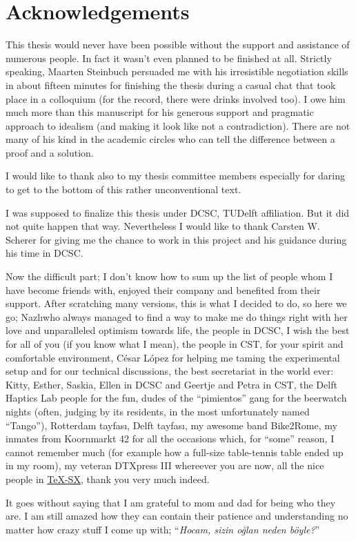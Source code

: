 \chapter{Acknowledgements}

This thesis would never have been possible without the support and assistance of numerous people. In fact it wasn't even planned to be 
finished at all. Strictly speaking, Maarten Steinbuch persuaded me with his irresistible negotiation skills in about fifteen minutes for 
finishing the thesis during a casual chat that took place in a colloquium (for the record, there were drinks involved too). 
I owe him much more than this manuscript for his generous support and pragmatic approach to idealism (and making it look like not a 
contradiction). There are not many of his kind in the academic circles who can tell the difference between a proof and a solution.

I would like to thank also to my thesis committee members especially for daring to get to the bottom of this rather unconventional text. 

I was supposed to finalize this thesis under DCSC, \textsf{TUDelft} affiliation. But it did not quite happen that way. Nevertheless I would like to 
thank Carsten W. Scherer for giving me the chance to work in this project and his guidance during his time in DCSC. 

Now the difficult part; I don't know how to sum up the list of people whom I have become friends with, enjoyed their company and benefited 
from their support. After scratching many versions, this is what I decided to do, so here we go; Nazl\i\space who always managed to find a 
way to make me do things right with her love and unparalleled optimism towards life, the people in DCSC, I wish the best for 
all of you (if you know what I mean), the people in CST, for your spirit and comfortable environment, C\'{e}sar L\'{o}pez for helping 
me taming the experimental setup and for our technical discussions, the best secretariat in the world ever: Kitty, Esther, Saskia, Ellen 
in DCSC and Geertje and Petra in CST, the Delft Haptics Lab people for the fun, dudes of the \enquote{pimientos} gang for the beerwatch 
nights (often, judging by its residents, in the most unfortunately named \enquote{Tango}), Rotterdam tayfas\i, Delft tayfas\i, my awesome 
band Bike2Rome, my inmates from Koornmarkt 42 for all the occasions which, for \enquote{some} reason, I cannot remember much (for example 
how a full-size table-tennis table ended up in my room), my veteran DTXpress III whereever you are now, all the nice people in 
\href{http://tex.stackexchange.com}{\TeX-SX}, thank you very much indeed. 

It goes without saying that I am grateful to mom and dad for being who they are. I am still amazed how they can contain their patience and 
understanding no matter how crazy stuff I come up with; \enquote{\emph{Hocam, sizin o\u{g}lan neden b\"{o}yle?}}